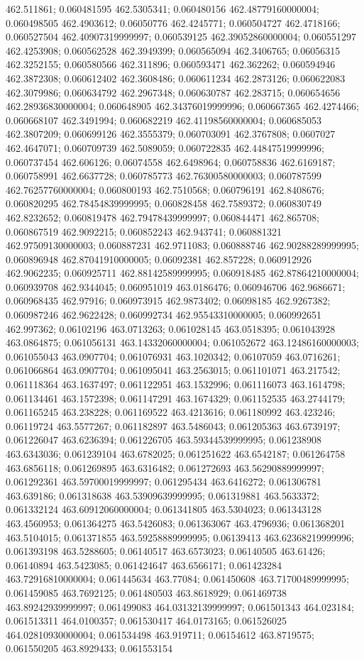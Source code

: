 462.511861; 0.060481595 462.5305341; 0.060480156 462.48779160000004; 0.060498505 462.4903612; 0.06050776 462.4245771; 0.060504727 462.4718166; 0.060527504 462.40907319999997; 0.060539125 462.39052860000004; 0.060551297 462.4253908; 0.060562528 462.3949399; 0.060565094 462.3406765; 0.06056315 462.3252155; 0.060580566 462.311896; 0.060593471 462.362262; 0.060594946 462.3872308; 0.060612402 462.3608486; 0.060611234 462.2873126; 0.060622083 462.3079986; 0.060634792 462.2967348; 0.060630787 462.283715; 0.060654656 462.28936830000004; 0.060648905 462.34376019999996; 0.060667365 462.4274466; 0.060668107 462.3491994; 0.060682219 462.41198560000004; 0.060685053 462.3807209; 0.060699126 462.3555379; 0.060703091 462.3767808; 0.0607027 462.4647071; 0.060709739 462.5089059; 0.060722835 462.44847519999996; 0.060737454 462.606126; 0.06074558 462.6498964; 0.060758836 462.6169187; 0.060758991 462.6637728; 0.060785773 462.76300580000003; 0.060787599 462.76257760000004; 0.060800193 462.7510568; 0.060796191 462.8408676; 0.060820295 462.78454839999995; 0.060828458 462.7589372; 0.060830749 462.8232652; 0.060819478 462.79478439999997; 0.060844471 462.865708; 0.060867519 462.9092215; 0.060852243 462.943741; 0.060881321 462.97509130000003; 0.060887231 462.9711083; 0.060888746 462.90288289999995; 0.060896948 462.87041910000005; 0.06092381 462.857228; 0.060912926 462.9062235; 0.060925711 462.88142589999995; 0.060918485 462.87864210000004; 0.060939708 462.9344045; 0.060951019 463.0186476; 0.060946706 462.9686671; 0.060968435 462.97916; 0.060973915 462.9873402; 0.06098185 462.9267382; 0.060987246 462.9622428; 0.060992734 462.95543310000005; 0.060992651 462.997362; 0.06102196 463.0713263; 0.061028145 463.0518395; 0.061043928 463.0864875; 0.061056131 463.14332060000004; 0.061052672 463.12486160000003; 0.061055043 463.0907704; 0.061076931 463.1020342; 0.06107059 463.0716261; 0.061066864 463.0907704; 0.061095041 463.2563015; 0.061101071 463.217542; 0.061118364 463.1637497; 0.061122951 463.1532996; 0.061116073 463.1614798; 0.061134461 463.1572398; 0.061147291 463.1674329; 0.061152535 463.2744179; 0.061165245 463.238228; 0.061169522 463.4213616; 0.061180992 463.423246; 0.06119724 463.5577267; 0.061182897 463.5486043; 0.061205363 463.6739197; 0.061226047 463.6236394; 0.061226705 463.59344539999995; 0.061238908 463.6343036; 0.061239104 463.6782025; 0.061251622 463.6542187; 0.061264758 463.6856118; 0.061269895 463.6316482; 0.061272693 463.56290889999997; 0.061292361 463.59700019999997; 0.061295434 463.6416272; 0.061306781 463.639186; 0.061318638 463.53909639999995; 0.061319881 463.5633372; 0.061332124 463.60912060000004; 0.061341805 463.5304023; 0.061343128 463.4560953; 0.061364275 463.5426083; 0.061363067 463.4796936; 0.061368201 463.5104015; 0.061371855 463.59258889999995; 0.06139413 463.62368219999996; 0.061393198 463.5288605; 0.06140517 463.6573023; 0.06140505 463.61426; 0.06140894 463.5423085; 0.061424647 463.6566171; 0.061423284 463.72916810000004; 0.061445634 463.77084; 0.061450608 463.71700489999995; 0.061459085 463.7692125; 0.061480503 463.8618929; 0.061469738 463.89242939999997; 0.061499083 464.03132139999997; 0.061501343 464.023184; 0.061513311 464.0100357; 0.061530417 464.0173165; 0.061526025 464.02810930000004; 0.061534498 463.919711; 0.06154612 463.8719575; 0.061550205 463.8929433; 0.061553154 